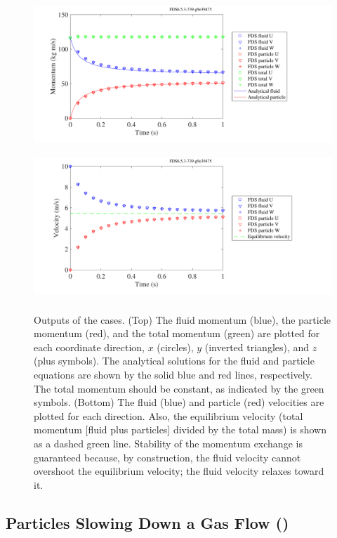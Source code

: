 \documentclass[11pt]{book}
\begin{document}
\begin{figure}[h]
\centering
\includegraphics[height=2.2in]{SCRIPT_FIGURES/fluid_part_momentum}\\
\includegraphics[height=2.2in]{SCRIPT_FIGURES/fluid_part_velocity}
\caption[Test of fluid-particle momentum transfer for nonstationary particles]{Outputs of the  cases.  (Top) The fluid momentum (blue), the particle momentum (red), and the total momentum (green) are plotted for each coordinate direction, $x$ (circles), $y$ (inverted triangles), and $z$ (plus symbols).  The analytical solutions for the fluid and particle equations are shown by the solid blue and red lines, respectively. The total momentum should be constant, as indicated by the green symbols. (Bottom) The fluid (blue) and particle (red) velocities are plotted for each direction.  Also, the equilibrium velocity (total momentum [fluid plus particles] divided by the total mass) is shown as a dashed green line.  Stability of the momentum exchange is guaranteed because, by construction, the fluid velocity cannot overshoot the equilibrium velocity; the fluid velocity relaxes toward it.}
\label{fig_fluid_part_mom}
\end{figure}


\subsection{Particles Slowing Down a Gas Flow (\texorpdfstring{}{particle\_drag})}
\label{particle_drag}
\label{particle_drag_U10_N16}
\label{particle_drag_U50_N16}
\label{particle_drag_U100_N16}
\label{particle_drag_U50_N1600}
\label{particle_drag_U100_N1600}
\label{particle_drag_U150_N1600}
\end{document}
